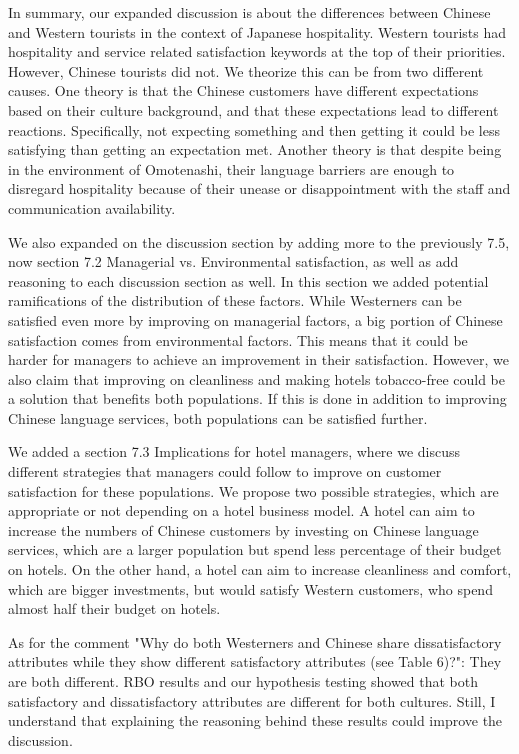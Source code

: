 \documentclass{letter}
\begin{document}
In summary, our expanded discussion is about the differences between Chinese and Western tourists in the context of Japanese hospitality. Western tourists had hospitality and service related satisfaction keywords at the top of their priorities. However, Chinese tourists did not. We theorize this can be from two different causes. One theory is that the Chinese customers have different expectations based on their culture background, and that these expectations lead to different reactions. Specifically, not expecting something and then getting it could be less satisfying than getting an expectation met. Another theory is that despite being in the environment of Omotenashi, their language barriers are enough to disregard hospitality because of their unease or disappointment with the staff and communication availability.

We also expanded on the discussion section by adding more to the previously 7.5, now section 7.2 Managerial vs. Environmental satisfaction, as well as add reasoning to each discussion section as well. In this section we added potential ramifications of the distribution of these factors. While Westerners can be satisfied even more by improving on managerial factors, a big portion of Chinese satisfaction comes from environmental factors. This means that it could be harder for managers to achieve an improvement in their satisfaction. However, we also claim that improving on cleanliness and making hotels tobacco-free could be a solution that benefits both populations. If this is done in addition to improving Chinese language services, both populations can be satisfied further.

We added a section 7.3 Implications for hotel managers, where we discuss different strategies that managers could follow to improve on customer satisfaction for these populations. We propose two possible strategies, which are appropriate or not depending on a hotel business model. A hotel can aim to increase the numbers of Chinese customers by investing on Chinese language services, which are a larger population but spend less percentage of their budget on hotels. On the other hand, a hotel can aim to increase cleanliness and comfort, which are bigger investments, but would satisfy Western customers, who spend almost half their budget on hotels.

As for the comment "Why do both Westerners and Chinese share dissatisfactory attributes while they show different satisfactory attributes (see Table 6)?": They are both different. RBO results and our hypothesis testing showed that both satisfactory and dissatisfactory attributes are different for both cultures. Still, I understand that explaining the reasoning behind these results could improve the discussion.
\end{document}

